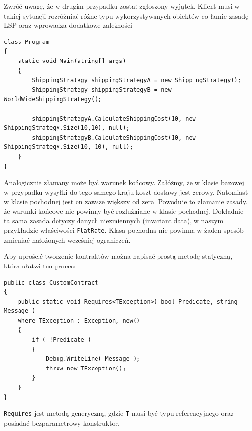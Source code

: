 Zwróć uwagę, że w drugim przypadku został zgłoszony wyjątek. Klient musi w takiej sytuacji rozróżniać różne typu wykorzystywanych obiektów co łamie zasadę LSP oraz wprowadza dodatkowe zależności 

\begin{lstlisting}[caption={Wywołanie metod klas ShippingStrategy oraz WolrdWideShippingStrategy}, label={lab1/lst/lspShippingStrategiesCall}]
class Program
{
	static void Main(string[] args)
	{
		ShippingStrategy shippingStrategyA = new ShippingStrategy();
		ShippingStrategy shippingStrategyB = new WorldWideShippingStrategy();
		
		shippingStrategyA.CalculateShippingCost(10, new ShippingStrategy.Size(10,10), null);
		shippingStrategyB.CalculateShippingCost(10, new ShippingStrategy.Size(10, 10), null);
	}
}
\end{lstlisting}

Analogicznie złamany może być warunek końcowy. Załóżmy, że w klasie bazowej w przypadku wysyłki do tego samego kraju koszt dostawy jest zerowy. Natomiast w klasie pochodnej jest on zawsze większy od zera. Powoduje to złamanie zasady, że warunki końcowe nie powinny być rozluźniane w klasie pochodnej. Dokładnie ta sama zasada dotyczy danych niezmiennych (invariant data), w naszym przykładzie właściwości \texttt{FlatRate}. Klasa pochodna nie powinna w żaden sposób zmieniać nałożonych wcześniej ograniczeń.

Aby uprościć tworzenie kontraktów można napisać prostą metodę statyczną, która ułatwi ten proces:
\begin{lstlisting}
public class CustomContract
{
	public static void Requires<TException>( bool Predicate, string Message )
	where TException : Exception, new()
	{
		if ( !Predicate )
		{
			Debug.WriteLine( Message );
			throw new TException();
		}
	}
}  	
\end{lstlisting}
\texttt{Requires} jest metodą generyczną, gdzie \texttt{T} musi być typu referencyjnego oraz posiadać bezparametrowy konstruktor.




